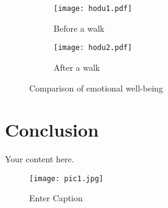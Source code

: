 \documentclass[sigconf]{acmart}
\begin{document}
\begin{figure*}[t!]
  \centering
  \begin{subfigure}{0.45\textwidth}
    \centering
    \texttt{[image: hodu1.pdf]}
    \caption{Before a walk}
    \label{fig:before}
  \end{subfigure}
  \hfill 
  \begin{subfigure}{0.45\textwidth}
    \centering
    \texttt{[image: hodu2.pdf]}
    \caption{After a walk}
    \label{fig:after}
  \end{subfigure}
  \caption{Comparison of emotional well-being}
  \label{fig:comparison}
\end{figure*}

\section{Conclusion}
Your content here.


\begin{figure}
    \centering
    \texttt{[image: pic1.jpg]}
    \caption{Enter Caption}
    \label{fig:enter-label}
\end{figure}
\end{document}
